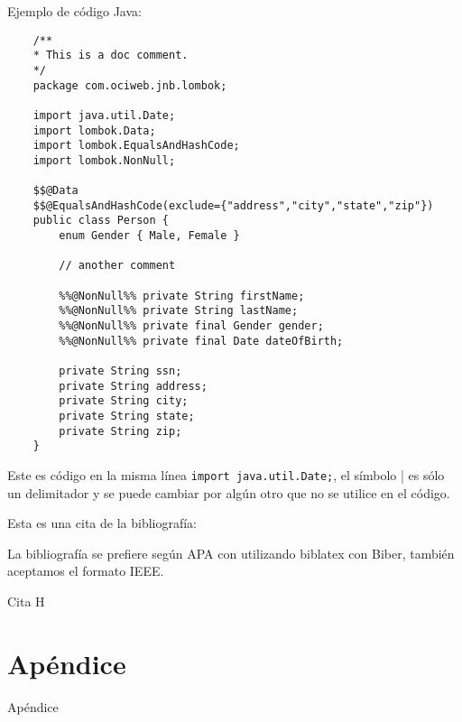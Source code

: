 \documentclass[fleqn]{Paquetes/RevDigMatEduInt}
\begin{document}

Ejemplo de código Java:

\begin{lstlisting}
	/**
	* This is a doc comment.
	*/
	package com.ociweb.jnb.lombok;
	
	import java.util.Date;
	import lombok.Data;
	import lombok.EqualsAndHashCode;
	import lombok.NonNull;
	
	$$@Data
	$$@EqualsAndHashCode(exclude={"address","city","state","zip"})
	public class Person {
		enum Gender { Male, Female }
		
		// another comment
		
		%%@NonNull%% private String firstName;
		%%@NonNull%% private String lastName;
		%%@NonNull%% private final Gender gender;
		%%@NonNull%% private final Date dateOfBirth;
		
		private String ssn;
		private String address;
		private String city;
		private String state;
		private String zip;
	}
\end{lstlisting}

Este es código en la misma línea \lstinline|import java.util.Date;|, el símbolo | es sólo un delimitador y se puede cambiar por algún otro que no se utilice en el código.



Esta es una cita de la bibliografía: \cite{H}

La bibliografía se prefiere según APA con utilizando biblatex con Biber, también aceptamos el formato IEEE.



\begin{thebibliography}{AAAAA}
	 Cita H
\end{thebibliography}

\appendix

\section{Apéndice}

Apéndice
\end{document}

